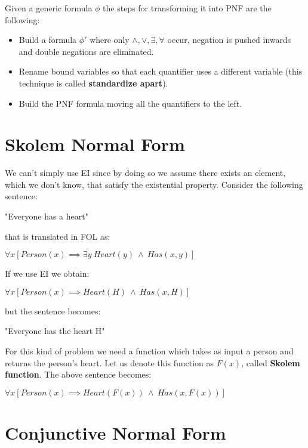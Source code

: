 \documentclass{article}
\begin{document}
Given a generic formula $\phi$ the steps for transforming it into PNF are the following:
\begin{itemize}
    \item Build a formula $\phi'$ where only $\land, \lor, \exists, \forall$ occur, negation is pushed inwards and double negations are eliminated.
    \item Rename bound variables so that each quantifier uses a different variable (this technique is called \textbf{standardize apart}).
    \item Build the PNF formula moving all the quantifiers to the left.
\end{itemize}

\newpage

\section{Skolem Normal Form}

We can't simply use EI since by doing so we assume there exists an element, which we don't know, that satisfy the existential property. Consider the following sentence:

\begin{center}
    "Everyone has a heart"
\end{center}
that is translated in FOL as:
\begin{center}
    $\forall x[Person(x) \implies \exists y\ Heart(y)\ \land\ Has(x,y)]$
\end{center}
If we use EI we obtain:
\begin{center}
    $\forall x[Person(x) \implies Heart(H)\ \land\ Has(x, H)]$
\end{center}
but the sentence becomes:
\begin{center}
    "Everyone has the heart H"
\end{center}

For this kind of problem we need a function which takes as input a person and returns the person's heart. Let us denote this function as $F(x)$, called \textbf{Skolem function}. The above sentence becomes:
\begin{center}
    $\forall x[Person(x) \implies Heart(F(x))\ \land\ Has(x, F(x))]$
\end{center}

\section{Conjunctive Normal Form}
\end{document}
